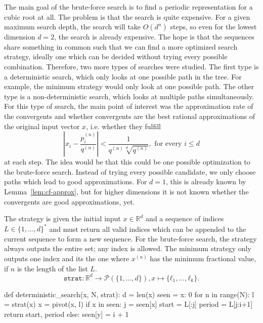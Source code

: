 The main goal of the brute-force search is to find a periodic representation for a cubic root at all.
The problem is that the search is quite expensive.
For a given maximum search depth, the search will take $O(d^n)$ steps,
so even for the lowest dimension $d = 2$, the search is already expensive.
The hope is that the sequences share something in common such that we can find
a more optimized search strategy, ideally one which can be decided without
trying every possible combination.
Therefore, two more types of searches were studied.
The first type is a deterministic search,
which only looks at one possible path in the tree.
For example, the minimum strategy would only look at one possible path.
The other type is a non-deterministic search,
which looks at multiple paths simultaneously.
For this type of search, the main point of interest was the approximation rate of the convergents
and whether convergents are the best rational approximations of the original input vector $x$,
i.e. whether they fulfill
\[
  \left|x_i - \frac{p_i^{(n)}}{q^{(n)}}\right| < \frac{1}{q^{(n)} \sqrt[d]{q^{(n)}}}, \text{ for every } i ≤ d
\]
at each step.
The idea would be that this could be one possible optimization to the brute-force search.
Instead of trying every possible candidate, we only choose paths which lead to good approximations.
For $d = 1$, this is already known by Lemma~\ref{lem:cf-approx},
but for higher dimensions it is not known whether the convergents are good
approximations, yet.

The strategy is given the initial input $x ∈ ℝ^d$ and a sequence of indices $L
∈ \{1, …, d\}^*$ and must return all valid indices which can be appended to the
current sequence to form a new sequence.
For the brute-force search, the strategy always outputs the entire set; any index is allowed.
The minimum strategy only outputs one index and its the one where $x^{(n)}$ has
the minimum fractional value, if $n$ is the length of the list $L$.
\[
  \texttt{strat} \colon ℝ^d → \mathcal P(\{1, …, d\}), x ↦ \{ℓ_1, …, ℓ_k\}.
\]

\begin{Python}[
    float=tbp,
    numbers=left,
    caption={
      The implementation of the deterministic search.
      The strategy \texttt{strat} only outputs a single index, which is used
      for pivoting.
      The search stops once a duplicate vector $x$ has been found and returns
      the preperiod and period once found.
    },
    label={lst:det-search},
  ]
def deterministic_search(x, N, strat):
  d = len(x)
  seen = {x: 0}
  for n in range(N):
    l = strat(x)
    x = pivot(x, l)
    if x in seen:
      j = seen[x]
      start = L[:j]
      period = L[j:i+1]
      return start, period
    else:
      seen[y] = i + 1
\end{Python}

